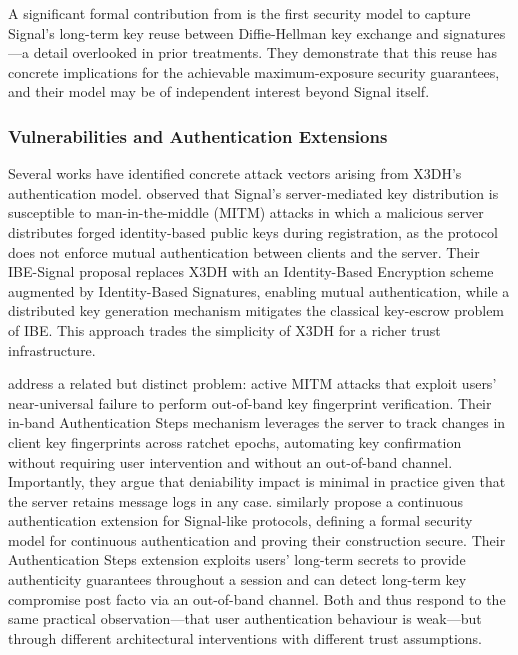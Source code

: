 A significant formal contribution from \textcite{fiedler2025} is the first security model to capture Signal's long-term key reuse between Diffie-Hellman key exchange and signatures—a detail overlooked in prior treatments. They demonstrate that this reuse has concrete implications for the achievable maximum-exposure security guarantees, and their model may be of independent interest beyond Signal itself.

\subsubsection{Vulnerabilities and Authentication Extensions}

Several works have identified concrete attack vectors arising from X3DH's authentication model. \textcite{liu2022} observed that Signal's server-mediated key distribution is susceptible to man-in-the-middle (MITM) attacks in which a malicious server distributes forged identity-based public keys during registration, as the protocol does not enforce mutual authentication between clients and the server. Their IBE-Signal proposal replaces X3DH with an Identity-Based Encryption scheme augmented by Identity-Based Signatures, enabling mutual authentication, while a distributed key generation mechanism mitigates the classical key-escrow problem of IBE. This approach trades the simplicity of X3DH for a richer trust infrastructure.

\textcite{teng2024} address a related but distinct problem: active MITM attacks that exploit users' near-universal failure to perform out-of-band key fingerprint verification. Their in-band Authentication Steps mechanism leverages the server to track changes in client key fingerprints across ratchet epochs, automating key confirmation without requiring user intervention and without an out-of-band channel. Importantly, they argue that deniability impact is minimal in practice given that the server retains message logs in any case. \textcite{dowling2022} similarly propose a continuous authentication extension for Signal-like protocols, defining a formal security model for continuous authentication and proving their construction secure. Their Authentication Steps extension exploits users' long-term secrets to provide authenticity guarantees throughout a session and can detect long-term key compromise post facto via an out-of-band channel. Both \textcite{teng2024} and \textcite{dowling2022} thus respond to the same practical observation—that user authentication behaviour is weak—but through different architectural interventions with different trust assumptions.

